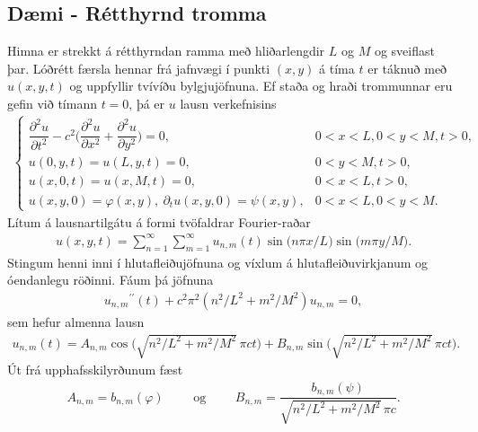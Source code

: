 \documentclass[a4paper,10pt,icelandic]{sphinxmanual}
\begin{document}
\subsection{Dæmi - Rétthyrnd tromma}
\label{\detokenize{Kafli03:daemi-retthyrnd-tromma}}
Himna er strekkt á rétthyrndan ramma með hliðarlengdir \(L\) og \(M\) og sveiflast þar. Lóðrétt færsla hennar frá jafnvægi
í punkti \((x,y)\) á tíma \(t\) er táknuð með \(u(x,y,t)\) og uppfyllir tvívíðu bylgjujöfnuna. Ef staða og hraði
trommunnar eru gefin við tímann \(t=0\), þá er \(u\) lausn
verkefnisins
\begin{equation*}
\begin{split}\begin{cases}
 \dfrac{{\partial^2} u}{{\partial} t^2}
 -c^2\bigg(\dfrac{\partial^2u}{\partial x^2}
 +\dfrac{\partial^2u}{\partial y^2}\bigg)=0,
 &0<x<L, 0<y<M, t>0,\\
 u(0,y,t)=u(L,y,t)=0,
 &0<y<M, t>0,\\
 u(x,0,t)=u(x,M,t)=0,
 &0<x<L, t>0,\\
 u(x,y,0)=\varphi(x,y), \ {\partial}_tu(x,y,0)={\psi}(x,y),
 &0<x<L, 0<y<M.
 \end{cases}\end{split}
\end{equation*}
Lítum á lausnartilgátu á formi tvöfaldrar Fourier-raðar
\begin{equation*}
\begin{split}u(x,y,t)=\sum\limits_{n=1}^{{\infty}}
 \sum\limits_{m=1}^{{\infty}} u_{n,m}(t)
 \sin\big(n{\pi}x/L\big)\sin\big(m{\pi}y/M\big).\end{split}
\end{equation*}
Stingum henni inni í hlutafleiðujöfnuna og víxlum á hlutafleiðuvirkjanum og óendanlegu röðinni. Fáum þá jöfnuna
\begin{equation*}
\begin{split}u_{n,m}{{^{\prime\prime}}}(t)+c^2{\pi}^2(n^2/L^2+m^2/M^2)u_{n,m}=0,\end{split}
\end{equation*}
sem hefur almenna lausn
\begin{equation*}
\begin{split}u_{n,m}(t)=A_{n,m}\cos\big(\sqrt{n^2/L^2+m^2/M^2}\, {\pi}ct\big)
 +B_{n,m}\sin\big(\sqrt{n^2/L^2+m^2/M^2}\, {\pi}ct\big).\end{split}
\end{equation*}
Út frá upphafsskilyrðunum fæst
\begin{equation*}
\begin{split}A_{n,m}=b_{n,m}({\varphi}) \qquad \text{ og } \qquad
 B_{n,m}=\dfrac{b_{n,m}({\psi})}{\sqrt{n^2/L^2+m^2/M^2}\, {\pi}c}.\end{split}
\end{equation*}
\end{document}
